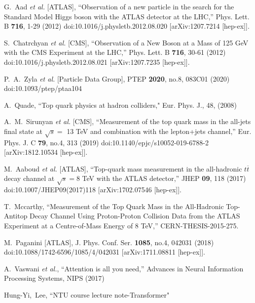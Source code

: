 \begin{thebibliography}{99}

G.~Aad \textit{et al.} [ATLAS],
``Observation of a new particle in the search for the Standard Model Higgs boson with the ATLAS detector at the LHC,''
Phys. Lett. B \textbf{716}, 1-29 (2012)
doi:10.1016/j.physletb.2012.08.020
[arXiv:1207.7214 [hep-ex]].

S.~Chatrchyan \textit{et al.} [CMS],
``Observation of a New Boson at a Mass of 125 GeV with the CMS Experiment at the LHC,''
Phys. Lett. B \textbf{716}, 30-61 (2012)
doi:10.1016/j.physletb.2012.08.021
[arXiv:1207.7235 [hep-ex]].

P.~A.~Zyla \textit{et al.} [Particle Data Group],
PTEP \textbf{2020}, no.8, 083C01 (2020)
doi:10.1093/ptep/ptaa104

A.~Quade,
``Top quark physics at hadron colliders,"
Eur. Phys. J., 48, (2008)

A.~M.~Sirunyan \textit{et al.} [CMS],
``Measurement of the top quark mass in the all-jets final state at $\sqrt{s} =$ 13 TeV and combination with the lepton+jets channel,''
Eur. Phys. J. C \textbf{79}, no.4, 313 (2019)
doi:10.1140/epjc/s10052-019-6788-2
[arXiv:1812.10534 [hep-ex]].

M.~Aaboud \textit{et al.} [ATLAS],
``Top-quark mass measurement in the all-hadronic $ t\overline{t} $ decay channel at $ \sqrt{s}=8 $ TeV with the ATLAS detector,''
JHEP \textbf{09}, 118 (2017)
doi:10.1007/JHEP09(2017)118
[arXiv:1702.07546 [hep-ex]].

T.~Mccarthy,
``Measurement of the Top Quark Mass in the All-Hadronic Top-Antitop Decay Channel Using Proton-Proton Collision Data from the ATLAS Experiment at a Centre-of-Mass Energy of 8 TeV,''
CERN-THESIS-2015-275.

M.~Paganini [ATLAS],
J. Phys. Conf. Ser. \textbf{1085}, no.4, 042031 (2018)
doi:10.1088/1742-6596/1085/4/042031
[arXiv:1711.08811 [hep-ex]].

A.~Vaswani \textit{et al.},
``Attention is all you need,''
Advances in Neural Information Processing Systems, NIPS (2017)

Hung-Yi,~Lee,
``NTU course lecture note-Transformer"


\end{thebibliography}
\newpage
